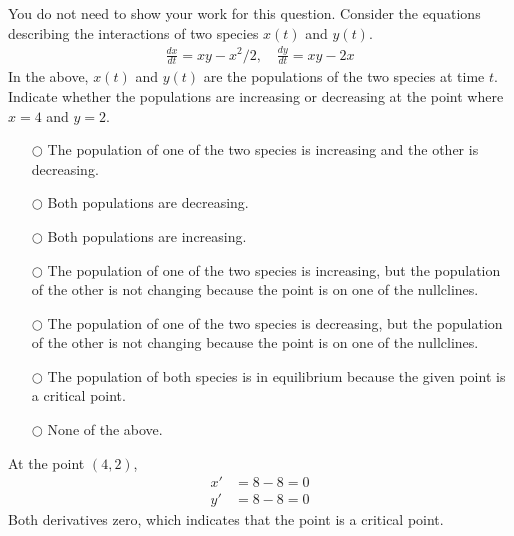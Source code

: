 \ifnum {}
\question[1] You do not need to show your work for this question. Consider the equations describing the interactions of two species $x(t)$ and $y(t)$.
\begin{align}
    \frac{dx}{dt} = xy-x^2/2, \quad \frac{dy}{dt} = xy-2x
\end{align}
In the above, $x(t)$ and $y(t)$ are the populations of the two species at time $t$. Indicate whether the populations are increasing or decreasing at the point where $x=4$ and $y=2$. 
\begin{itemize}
    \item[$\bigcirc$] The population of one of the two species is increasing and the other is decreasing. 
    \item[$\bigcirc$]Both populations are decreasing.
    \item[$\bigcirc$]Both populations are increasing.
    \item[$\bigcirc$]The population of one of the two species is increasing, but the population of the other is not changing because the point is on one of the nullclines. 
    \item[$\bigcirc$]The population of one of the two species is decreasing, but the population of the other is not changing because the point is on one of the nullclines. 
    \item[$\bigcirc$]The population of both species is in equilibrium because the given point is a critical point.
    \item[$\bigcirc$]None of the above.
\end{itemize}
\ifnum {} {\color{DarkBlue}
At the point $(4,2)$, 
\begin{align}
    x' &= 8 - 8 = 0 \\
    y' &= 8 - 8 =0
\end{align}
Both derivatives zero, which indicates that the point is a critical point. 
} 
\else 
\vspace{0.5cm}
\fi    
\fi 


